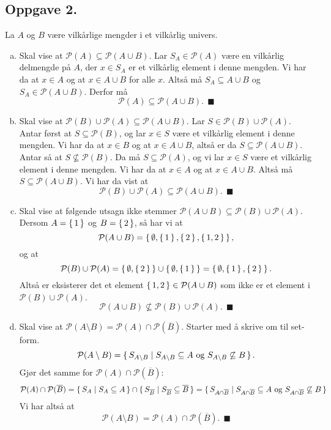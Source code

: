 \documentclass{article}
\begin{document}
\subsection*{Oppgave 2.}
La $A$ og $B$ være vilkårlige mengder i et vilkårlig univers.
\begin{enumerate}[(a)]
    \item {
        Skal vise at $\mathcal{P}(A) \subseteq \mathcal{P}(A \cup B)$. Lar $S_A \in \mathcal{P}(A)$ være en 
        vilkårlig delmengde på $A$, der $x \in S_A$ er et vilkårlig element i denne mengden. Vi har da at $x \in A$ og 
        at $x \in A \cup B$ for alle $x$. Altså må $S_A \subseteq A \cup B$ og $S_A \in \mathcal{P}(A \cup B)$. Derfor må 
        $$\mathcal{P}(A) \subseteq \mathcal{P}(A \cup B)\text{.}\:\:\blacksquare$$ 
    }
    \item {
        Skal vise at $\mathcal{P}(B) \cup \mathcal{P}(A) \subseteq \mathcal{P}(A \cup B)$.
        Lar $S \in \mathcal{P}(B) \cup \mathcal{P}(A)$. Antar først at $S \subseteq \mathcal{P}(B)$, og lar $x \in S$ være 
        et vilkårlig element i denne mengden. Vi har da at $x \in B$ og at $x \in A \cup B$, altså er da $S \subseteq \mathcal{P}(A \cup B)$.
        Antar så at $S \not\subseteq \mathcal{P}(B)$. Da må $S \subseteq \mathcal{P}(A)$, og vi lar $x \in S$ være et vilkårlig element 
        i denne mengden. Vi har da at $x \in A$ og at $x \in A \cup B$. Altså må $S \subseteq \mathcal{P}(A \cup B)$. Vi har da vist at 
        $$\mathcal{P}(B) \cup \mathcal{P}(A) \subseteq \mathcal{P}(A \cup B)\text{.}\:\:\blacksquare$$
    }
    \item {
        Skal vise at følgende utsagn ikke stemmer $\mathcal{P}(A \cup B) \subseteq \mathcal{P}(B) \cup \mathcal{P}(A)$. 
        Dersom $A = \set{1}$ og $B = \set{2}$, så har vi at \\ 
        $$\mathcal{P}(A \cup B) = \set{\emptyset, \set{1}, \set{2}, \set{1, 2}}\text{,}$$ 
        og at \\
        $$\mathcal{P}(B) \cup \mathcal{P}(A) = \set{\emptyset, \set{2}} \cup \set{\emptyset, \set{1}} = \set{\emptyset, \set{1}, \set{2}}\text{.}$$
        Altså er eksisterer det et element $\set{1, 2} \in \mathcal{P}(A \cup B)$ som ikke er et element i $\mathcal{P}(B) \cup \mathcal{P}(A)$. \\
        $$\mathcal{P}(A \cup B) \not\subseteq \mathcal{P}(B) \cup \mathcal{P}(A)\text{.}\:\:\blacksquare$$
    }
    \item {
        Skal vise at $\mathcal{P}(A \setminus B) = \mathcal{P}(A) \cap \mathcal{P}(\overline{B})$.
        Starter med å skrive om til set-form.
        $$\mathcal{P}(A \setminus B) = \set{ S_{A \setminus B} \mid S_{A \setminus B} \subseteq A \text{ og } S_{A \setminus B} \not\subseteq B}\text{.}$$
        Gjør det samme for $\mathcal{P}(A) \cap \mathcal{P}(\overline{B})$:
        $$\mathcal{P}(A) \cap \mathcal{P}(\overline{B}) = \set{S_A \mid S_A \subseteq A} \cap \set{S_{\overline{B}} \mid S_{\overline{B}} \subseteq \overline{B}} = \set{S_{A \cap \overline{B}} \mid S_{A \cap \overline{B}} \subseteq A \text{ og } S_{A \cap \overline{B}} \not\subseteq B}$$
        Vi har altså at 
        $$\mathcal{P}(A \setminus B) = \mathcal{P}(A) \cap \mathcal{P}(\overline{B})\text{.}\:\:\blacksquare$$
    }
\end{enumerate}
\end{document}
